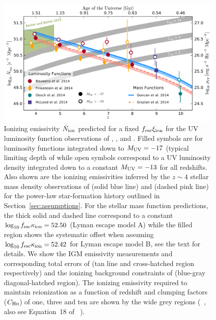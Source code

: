 \begin{figure}
\centering
  \includegraphics[width=\textwidth]{plots/Fig8.pdf}
  \caption[Ionizing emissivity $\dot{N}_{\rm{ion}}$ predicted for a fixed $f_{\rm{esc}}\xi_{\rm{ion}}$ for the UV luminosity function observations of \citet{Bouwens:2014tx}, \citet{Oesch:2014cs}, \citet{Finkelstein:2014ub} and \citet{McLeod:2014wz}.]{Ionizing emissivity $\dot{N}_{\rm{ion}}$ predicted for a fixed $f_{\rm{esc}}\xi_{\rm{ion}}$ for the UV luminosity function observations of \citet{Bouwens:2014tx}, \citet{Oesch:2014cs}, \citet{Finkelstein:2014ub} and \citet{McLeod:2014wz}. Filled symbols are for luminosity functions integrated down to $M_{\rm{UV}} = -17$ (typical limiting depth of  while open symbols correspond to a UV luminosity density integrated down to a constant $M_{\rm{UV}} = -13$ for all redshifts. Also shown are the ionizing emissivities inferred by the $z\sim4$ stellar mass density observations of \citet{Duncan:2014gh} (solid blue line) and \citet{Grazian:2014vx} (dashed pink line) for the power-law star-formation history  outlined in Section~\ref{sec:assumptions}. For the stellar mass function predictions, the thick solid and dashed line correspond to a constant $\log_{10}f_{\rm{esc}}\kappa_{\rm{ion}} = 52.50$ (Lyman escape model A) while the filled region shows the systematic offset when assuming $\log_{10}f_{\rm{esc}}\kappa_{\rm{ion}} = 52.42$ for Lyman escape model B, see the text for details. We show the IGM emissivity measurements and corresponding total errors of \citet{Becker:2013hc} (tan line and cross-hatched region respectively) and the ionizing background constraints of \citet{Bouwens:2015tm} (blue-gray diagonal-hatched region). The ionizing emissivity required to maintain reionization as a function of redshift and clumping factors ($C_{\textsc{Hii}}$) of one, three and ten are shown by the wide grey regions (\citeauthor{Madau:1999kl}~\citeyear{Madau:1999kl}, also see Equation~18 of \citeauthor{Bolton:2007gc}~\citeyear{Bolton:2007gc}).}
  \label{fig:Nion_constant}
\end{figure}


